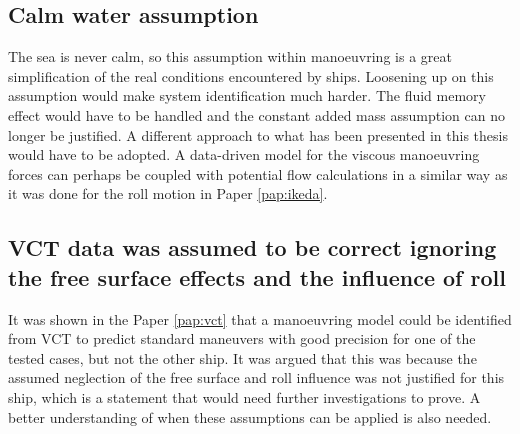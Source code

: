 \subsection*{Calm water assumption}
The sea is never calm, so this assumption within manoeuvring is a great simplification of the real conditions encountered by ships. Loosening up on this assumption would make system identification much harder. The fluid memory effect would have to be handled and the constant added mass assumption can no longer be justified. A different approach to what has been presented in this thesis would have to be adopted. A data-driven model for the viscous manoeuvring forces can perhaps be coupled with potential flow calculations in a similar way as it was done for the roll motion in Paper \ref{pap:ikeda}.  
    
\subsection*{VCT data was assumed to be correct ignoring the free surface effects and the influence of roll}
It was shown in the Paper \ref{pap:vct} that a manoeuvring model could be identified from VCT to predict standard maneuvers with good precision for one of the tested cases, but not the other ship. 
It was argued that this was because the assumed neglection of the free surface and roll influence was not justified for this ship, which is a statement that would need further investigations to prove. A better understanding of when these assumptions can be applied is also needed.   
        
